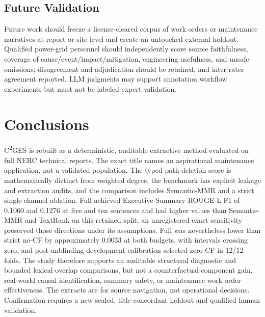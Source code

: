 \documentclass[applsci,article,submit,moreauthors]{Definitions/mdpi}
\newcommand{\cges}{C\textsuperscript{2}GES}
\begin{document}
\subsection{Future Validation}

Future work should freeze a license-cleared corpus of work orders or maintenance narratives at report or site level and create an untouched external holdout. Qualified power-grid personnel should independently score source faithfulness, coverage of cause/event/impact/mitigation, engineering usefulness, and unsafe omissions; disagreement and adjudication should be retained, and inter-rater agreement reported. LLM judgments may support annotation workflow experiments but must not be labeled expert validation.

\section{Conclusions}

\cges{} is rebuilt as a deterministic, auditable extractive method evaluated on full NERC technical reports. The exact title names an aspirational maintenance application, not a validated population. The typed path-deletion score is mathematically distinct from weighted degree, the benchmark has explicit leakage and extraction audits, and the comparison includes Semantic-MMR and a strict single-channel ablation. Full achieved Executive-Summary ROUGE-L F1 of 0.1060 and 0.1276 at five and ten sentences and had higher values than Semantic-MMR and TextRank on this retained split; an unregistered exact sensitivity preserved those directions under its assumptions. Full was nevertheless lower than strict no-CF by approximately 0.0033 at both budgets, with intervals crossing zero, and post-unblinding development calibration selected zero CF in 12/12 folds. The study therefore supports an auditable structural diagnostic and bounded lexical-overlap comparisons, but not a counterfactual-component gain, real-world causal identification, summary safety, or maintenance-work-order effectiveness. The extracts are for source navigation, not operational decisions. Confirmation requires a new sealed, title-concordant holdout and qualified human validation.
\end{document}
